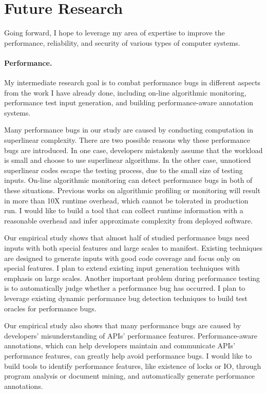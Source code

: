 \documentclass[10pt]{article}
\begin{document}
\section{Future Research}

Going forward, I hope to leverage my area of expertise to improve the performance, 
reliability, and security of various types of computer systems. 

\vspace{-.1in}
\paragraph{Performance.} 
My intermediate research goal is to combat performance bugs 
in different aspects from the work I have already done, 
including on-line algorithmic monitoring, performance test input generation, 
and building performance-aware annotation systems. 


Many performance bugs in our study are caused by conducting computation in superlinear complexity. 
There are two possible reasons why these performance bugs are introduced. 
In one case, developers mistakenly assume that the workload is small and choose to use superlinear algorithms. 
In the other case, unnoticed superlinear codes escape the testing process, due to the small size of testing inputs. 
On-line algorithmic monitoring can detect performance bugs in both of these situations. 
Previous works on algorithmic profiling or monitoring will result in more than 10X runtime overhead, 
which cannot be tolerated in production run.
I would like to build a tool that can collect runtime information with a reasonable overhead 
and infer approximate complexity from deployed software. 

Our empirical study shows that almost half of studied performance bugs need inputs with both special features and large scales to manifest. 
Existing techniques are designed to generate inputs with good code coverage and focus only on special features.
I plan to extend existing input generation techniques with emphasis on large scales. 
Another important problem during performance testing is to automatically judge whether a performance bug has occurred. 
I plan to leverage existing dynamic performance bug detection techniques to build test oracles for performance bugs.

Our empirical study also shows that many performance bugs are caused by developers' misunderstanding of APIs' performance features. 
Performance-aware annotations, which can help developers maintain and communicate APIs' performance features, 
can greatly help avoid performance bugs. 
I would like to build tools to identify performance features, like existence of locks or IO, 
through program analysis or document mining, 
and automatically generate performance annotations. 
\end{document}
